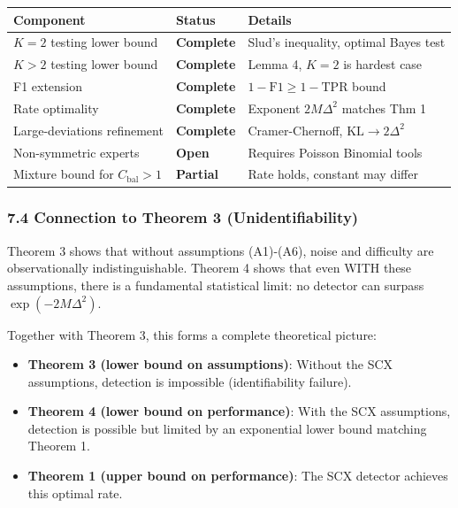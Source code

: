 \documentclass[
  12pt,
]{ctexart}
\providecommand{\tightlist}{%
  \setlength{\itemsep}{0pt}\setlength{\parskip}{0pt}}
\begin{document}
\begin{longtable}[]{@{}
  >{\raggedright\arraybackslash}p{}
  >{\raggedright\arraybackslash}p{}
  >{\raggedright\arraybackslash}p{}@{}}
\toprule\noalign{}
\begin{minipage}[b]{\linewidth}\raggedright
Component
\end{minipage} & \begin{minipage}[b]{\linewidth}\raggedright
Status
\end{minipage} & \begin{minipage}[b]{\linewidth}\raggedright
Details
\end{minipage} \\
\midrule\noalign{}
\endhead
\bottomrule\noalign{}
\endlastfoot
\(K=2\) testing lower bound & \textbf{Complete} & Slud's inequality,
optimal Bayes test \\
\(K>2\) testing lower bound & \textbf{Complete} & Lemma 4, \(K=2\) is
hardest case \\
F1 extension & \textbf{Complete} & \(1-\text{F1} \geq 1-\text{TPR}\)
bound \\
Rate optimality & \textbf{Complete} & Exponent \(2M\Delta^2\) matches
Thm 1 \\
Large-deviations refinement & \textbf{Complete} & Cramer-Chernoff,
\(\text{KL} \to 2\Delta^2\) \\
Non-symmetric experts & \textbf{Open} & Requires Poisson Binomial
tools \\
Mixture bound for \(C_{\text{bal}}>1\) & \textbf{Partial} & Rate holds,
constant may differ \\
\end{longtable}

\subsubsection{7.4 Connection to Theorem 3
(Unidentifiability)}\label{connection-to-theorem-3-unidentifiability}

Theorem 3 shows that without assumptions (A1)-(A6), noise and difficulty
are observationally indistinguishable. Theorem 4 shows that even WITH
these assumptions, there is a fundamental statistical limit: no detector
can surpass \(\exp(-2M\Delta^2)\).

Together with Theorem 3, this forms a complete theoretical picture:

\begin{itemize}
\tightlist
\item
  \textbf{Theorem 3 (lower bound on assumptions)}: Without the SCX
  assumptions, detection is impossible (identifiability failure).
\item
  \textbf{Theorem 4 (lower bound on performance)}: With the SCX
  assumptions, detection is possible but limited by an exponential lower
  bound matching Theorem 1.
\item
  \textbf{Theorem 1 (upper bound on performance)}: The SCX detector
  achieves this optimal rate.
\end{itemize}
\end{document}

